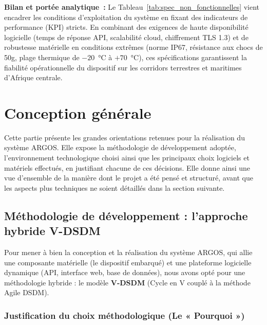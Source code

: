 \noindent \textbf{Bilan et portée analytique~:} 
Le Tableau~\ref{tab:spec_non_fonctionnelles} vient encadrer les conditions d'exploitation du système en fixant des indicateurs de performance (KPI) stricts. En combinant des exigences de haute disponibilité logicielle (temps de réponse API, scalabilité cloud, chiffrement TLS 1.3) et de robustesse matérielle en conditions extrêmes (norme IP67, résistance aux chocs de 50g, plage thermique de $-20$~°C à $+70$~°C), ces spécifications garantissent la fiabilité opérationnelle du dispositif sur les corridors terrestres et maritimes d'Afrique centrale.

\section{Conception générale}

Cette partie présente les grandes orientations retenues pour la réalisation du système ARGOS. Elle expose la méthodologie de développement adoptée, l'environnement technologique choisi ainsi que les principaux choix logiciels et matériels effectués, en justifiant chacune de ces décisions. Elle donne ainsi une vue d'ensemble de la manière dont le projet a été pensé et structuré, avant que les aspects plus techniques ne soient détaillés dans la section suivante.

\subsection{Méthodologie de développement : l'approche hybride V-DSDM}
\label{sec-methodologie-v-dsdm}

Pour mener à bien la conception et la réalisation du système ARGOS, qui allie une composante matérielle (le dispositif embarqué) et une plateforme logicielle dynamique (API, interface web, base de données), nous avons opté pour une méthodologie hybride : le modèle \textbf{V-DSDM} (Cycle en V couplé à la méthode Agile DSDM).

\subsubsection{Justification du choix méthodologique (Le « Pourquoi »)}

